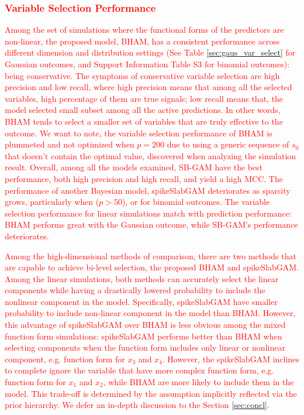 \documentclass[AMA,STIX1COL,]{WileyNJD-v2}
\begin{document}
\textcolor{red}{\subsubsection{Variable Selection Performance}}
\textcolor{red}{Among the set of simulations where the functional forms of the predictors are non-linear, the proposed model, BHAM, has a consistent performance across different dimension and distribution settings (See Table \ref{sec:gaus_var_select} for Gaussian outcomes, and Support Information Table S3 for binomial outcomes): being conservative. The symptoms of conservative variable selection are high precision and low recall, where high precision means that among all the selected variables, high percentage of them are true signals; low recall means that, the model selected small subset among all the active predictions. In other words, BHAM tends to select a smaller set of variables that are truly effective to the outcome. We want to note, the variable selection performance of BHAM is plummeted and not optimized when $p=200$ due to using a generic sequence of $s_0$ that doesn't contain the optimal value, discovered when analyzing the simulation result. Overall, among all the models examined, SB-GAM have the best performance, both high precision and high recall, and yield a high MCC. The performance of another Bayesian model, spikeSlabGAM deteriorates as sparsity grows, particularly when ($p>50$), or for binomial outcomes. The variable selection performance for linear simulations match with prediction performance: BHAM performs great with the Gaussian outcome, while SB-GAM's performance deteriorates.}

\textcolor{red}{Among the high-dimensional methods of comparison, there are two methods that are capable to achieve bi-level selection, the proposed BHAM and spikeSlabGAM. Among the linear simulations, both methods can accurately select the linear components while having a drastically lowered probability to include the nonlinear component in the model. Specifically, spikeSlabGAM have smaller probability to include non-linear component in the model than BHAM. However, this advantage of spikeSlabGAM over BHAM is less obvious among the mixed function form simulations: spikeSlabGAM performs better than BHAM when selecting components when the function form includes only linear or nonlinear component, e.g. function form for $x_3$ and $x_4$. However, the spikeSlabGAM inclines to complete ignore the variable that have more complex function form, e.g. function form for $x_1$ and $x_2$, while BHAM are more likely to include them in the model. This trade-off is determined by the assumption implicitly reflected via the prior hierarchy. We defer an in-depth discussion to the Section \ref{sec:concl}.}
\end{document}
